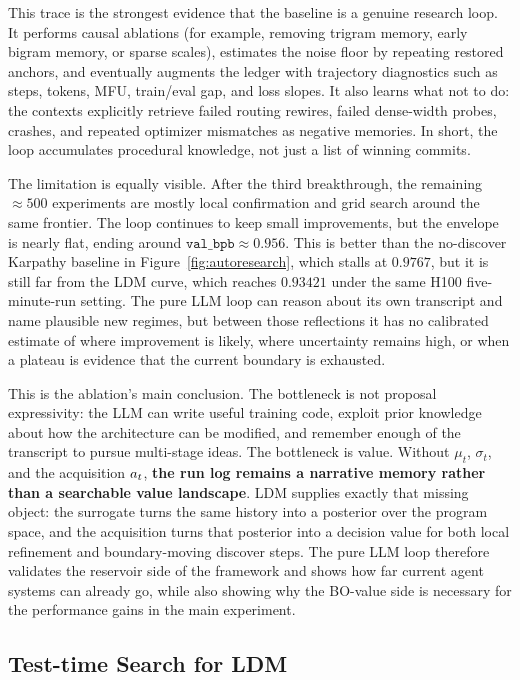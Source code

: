 This trace is the strongest evidence that the baseline is a genuine research loop. It performs causal ablations (for example, removing trigram memory, early bigram memory, or sparse scales), estimates the noise floor by repeating restored anchors, and eventually augments the ledger with trajectory diagnostics such as steps, tokens, MFU, train/eval gap, and loss slopes. It also learns what not to do: the contexts explicitly retrieve failed routing rewires, failed dense-width probes, crashes, and repeated optimizer mismatches as negative memories. In short, the loop accumulates procedural knowledge, not just a list of winning commits.

The limitation is equally visible. After the third breakthrough, the remaining $\approx500$ experiments are mostly local confirmation and grid search around the same frontier. The loop continues to keep small improvements, but the envelope is nearly flat, ending around $\texttt{val\_bpb}\approx0.956$. This is better than the no-discover Karpathy baseline in Figure~\ref{fig:autoresearch}, which stalls at $0.9767$, but it is still far from the LDM curve, which reaches $0.93421$ under the same H100 five-minute-run setting. The pure LLM loop can reason about its own transcript and name plausible new regimes, but between those reflections it has no calibrated estimate of where improvement is likely, where uncertainty remains high, or when a plateau is evidence that the current boundary is exhausted.

This is the ablation's main conclusion. The bottleneck is not proposal expressivity: the LLM can write useful training code, exploit prior knowledge about how the architecture can be modified, and remember enough of the transcript to pursue multi-stage ideas. The bottleneck is value. Without $\mu_t$, $\sigma_t$, and the acquisition $a_t$, \textbf{the run log remains a narrative memory rather than a searchable value landscape}. LDM supplies exactly that missing object: the surrogate turns the same history into a posterior over the program space, and the acquisition turns that posterior into a decision value for both local refinement and boundary-moving discover steps. The pure LLM loop therefore validates the reservoir side of the framework and shows how far current agent systems can already go, while also showing why the BO-value side is necessary for the performance gains in the main experiment.

\subsection{Test-time Search for LDM}
\label{app:abl-ldm}

